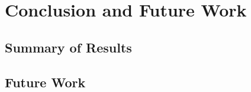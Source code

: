 \chapter{Conclusion and Future Work}
\label{chap:conclusion}

\section{Summary of Results}
\label{sec:conclusion-summary}

\section{Future Work}
\label{sec:conclusion-future-work}
